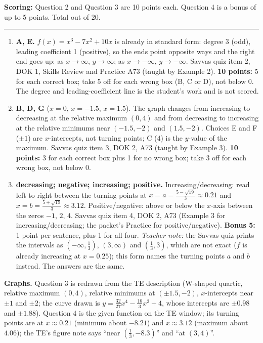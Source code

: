\documentclass[11pt]{article}
\begin{document}
\vfill
\noindent\textbf{Scoring:} Question 2 and Question 3 are 10 points each. Question 4 is a bonus of up to 5 points. Total out of 20.

\newpage
{}

\vspace{4pt}\noindent\rule{\textwidth}{0.6pt}

\begin{enumerate}
\item[\textbf{2.}] \textbf{A, E.} $f(x)=x^3-7x^2+10x$ is already in standard form: degree 3 (odd), leading coefficient 1 (positive), so the ends point opposite ways and the right end goes up: as $x\to\infty$, $y\to\infty$; as $x\to-\infty$, $y\to-\infty$. Savvas quiz item 2, DOK 1, Skills Review and Practice A73 (taught by Example 2). \textbf{10 points:} 5 for each correct box; take 5 off for each wrong box (B, C or D), not below 0. The degree and leading-coefficient line is the student's work and is not scored.
\item[\textbf{3.}] \textbf{B, D, G} ($x=0$, $x=-1.5$, $x=1.5$). The graph changes from increasing to decreasing at the relative maximum $(0,4)$ and from decreasing to increasing at the relative minimums near $(-1.5,-2)$ and $(1.5,-2)$. Choices E and F ($\pm1$) are $x$-intercepts, not turning points; C ($4$) is the $y$-value of the maximum. Savvas quiz item 3, DOK 2, A73 (taught by Example 3). \textbf{10 points:} 3 for each correct box plus 1 for no wrong box; take 3 off for each wrong box, not below 0.
\item[\textbf{4.}] \textbf{decreasing; negative; increasing; positive.} Increasing/decreasing: read left to right between the turning points at $x=a=\tfrac{5-\sqrt{19}}{3}\approx0.21$ and $x=b=\tfrac{5+\sqrt{19}}{3}\approx3.12$. Positive/negative: above or below the $x$-axis between the zeros $-1$, $2$, $4$. Savvas quiz item 4, DOK 2, A73 (Example 3 for increasing/decreasing; the packet's Practice for positive/negative). \textbf{Bonus 5:} 1 point per sentence, plus 1 for all four. \emph{Teacher note:} the Savvas quiz prints the intervals as $\left(-\infty,\tfrac13\right)$, $(3,\infty)$ and $\left(\tfrac13,3\right)$, which are not exact ($f$ is already increasing at $x=0.25$); this form names the turning points $a$ and $b$ instead. The answers are the same.
\end{enumerate}

\textbf{Graphs.} Question 3 is redrawn from the TE description (W-shaped quartic, relative maximum $(0,4)$, relative minimums at $(\pm1.5,-2)$, $x$-intercepts near $\pm1$ and $\pm2$; the curve drawn is $y=\tfrac{32}{27}x^4-\tfrac{16}{3}x^2+4$, whose intercepts are $\pm0.98$ and $\pm1.88$). Question 4 is the given function on the TE window; its turning points are at $x\approx0.21$ (minimum about $-8.21$) and $x\approx3.12$ (maximum about $4.06$); the TE's figure note says ``near $(\tfrac13,-8.3)$'' and ``at $(3,4)$''.
\end{document}
